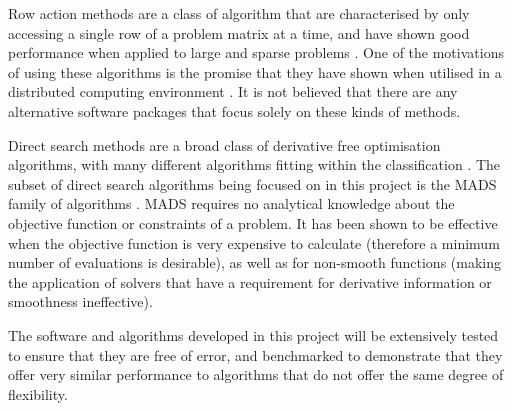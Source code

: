 Row action methods are a class of algorithm that are characterised by only accessing a single row of a problem matrix at a time, and have shown good performance when applied to large and sparse problems \cite{ROW-ACTIONCENSORS}. One of the motivations of using these algorithms is the promise that they have shown when utilised in a distributed computing environment \cite{Liu2014AnAlgorithm}. It is not believed that there are any alternative software packages that focus solely on these kinds of methods.

Direct search methods are a broad class of derivative free optimisation algorithms, with many different algorithms fitting within the classification \cite{2008DirectionalMethods}. The subset of direct search algorithms being focused on in this project is the \ac{MADS} family of algorithms \cite{Audet2007MeshOptimization}. \ac{MADS} requires no analytical knowledge about the objective function or constraints of a problem. It has been shown to be effective when the objective function is very expensive to calculate (therefore a minimum number of evaluations is desirable), as well as for non-smooth functions (making the application of solvers that have a requirement for derivative information or smoothness ineffective).

The software and algorithms developed in this project will be extensively tested to ensure that they are free of error, and benchmarked to demonstrate that they offer very similar performance to algorithms that do not offer the same degree of flexibility.
